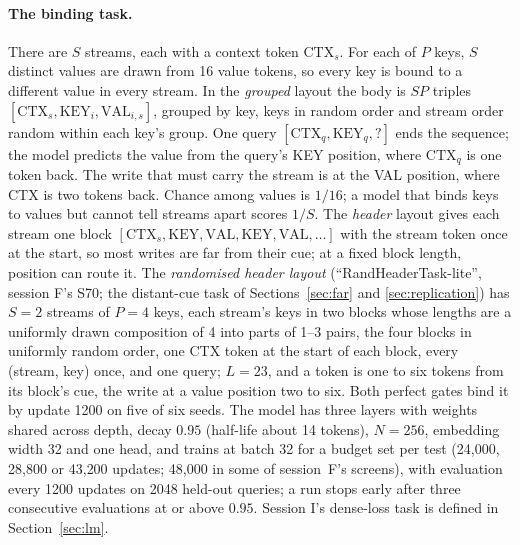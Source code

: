 \documentclass[11pt]{article}
\begin{document}
\paragraph{The binding task.} There are $S$ streams, each with a context token $\mathrm{CTX}_s$. For each of $P$ keys, $S$ distinct values are drawn from 16 value tokens, so every key is bound to a different value in every stream. In the \emph{grouped} layout the body is $S P$ triples $[\mathrm{CTX}_s, \mathrm{KEY}_i, \mathrm{VAL}_{i,s}]$, grouped by key, keys in random order and stream order random within each key's group. One query $[\mathrm{CTX}_q, \mathrm{KEY}_q, ?]$ ends the sequence; the model predicts the value from the query's KEY position, where $\mathrm{CTX}_q$ is one token back. The write that must carry the stream is at the VAL position, where CTX is two tokens back. Chance among values is $1/16$; a model that binds keys to values but cannot tell streams apart scores $1/S$. The \emph{header} layout gives each stream one block $[\mathrm{CTX}_s, \mathrm{KEY}, \mathrm{VAL}, \mathrm{KEY}, \mathrm{VAL}, \ldots]$ with the stream token once at the start, so most writes are far from their cue; at a fixed block length, position can route it. The \emph{randomised header layout} (``RandHeaderTask-lite'', session F's S70; the distant-cue task of Sections~\ref{sec:far} and \ref{sec:replication}) has $S = 2$ streams of $P = 4$ keys, each stream's keys in two blocks whose lengths are a uniformly drawn composition of 4 into parts of 1--3 pairs, the four blocks in uniformly random order, one CTX token at the start of each block, every (stream, key) once, and one query; $L = 23$, and a token is one to six tokens from its block's cue, the write at a value position two to six. Both perfect gates bind it by update 1200 on five of six seeds. The model has three layers with weights shared across depth, decay $0.95$ (half-life about 14 tokens), $N = 256$, embedding width 32 and one head, and trains at batch 32 for a budget set per test (24{,}000, 28{,}800 or 43{,}200 updates; 48{,}000 in some of session~F's screens), with evaluation every 1200 updates on 2048 held-out queries; a run stops early after three consecutive evaluations at or above $0.95$. Session I's dense-loss task is defined in Section~\ref{sec:lm}.
\end{document}
